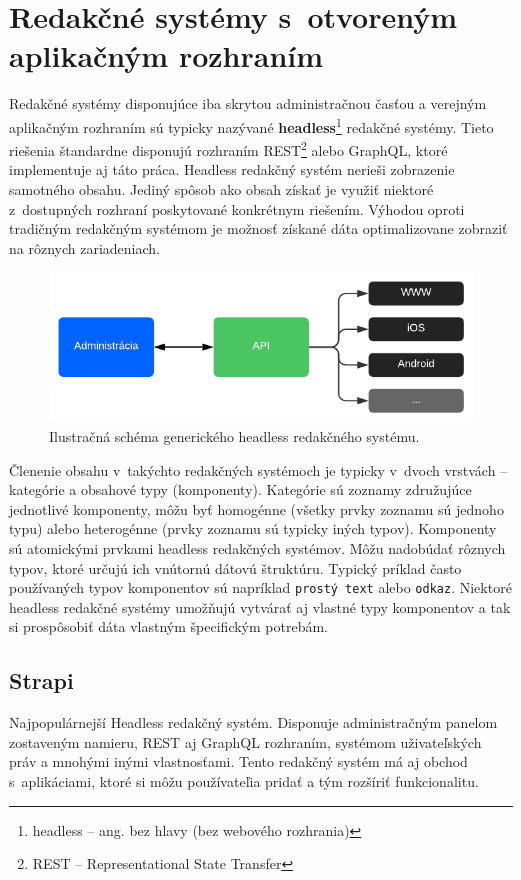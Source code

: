 \section{Redakčné systémy s~otvoreným aplikačným rozhraním}
\label{section:headless}
Redakčné systémy disponujúce iba skrytou administračnou časťou a verejným aplikačným rozhraním sú typicky nazývané \textbf{headless}\footnote{headless -- ang. bez hlavy (bez webového rozhrania)} redakčné systémy. Tieto riešenia štandardne disponujú rozhraním REST\footnote{REST -- Representational State Transfer} alebo GraphQL, ktoré implementuje aj táto práca. Headless redakčný systém nerieši zobrazenie samotného obsahu. Jediný spôsob ako obsah získať je využiť niektoré z~dostupných rozhraní poskytované konkrétnym riešením. Výhodou oproti tradičným redakčným systémom je možnosť získané dáta optimalizovane zobraziť na rôznych zariadeniach. 

\begin{figure}[h]
	\centering
	\includegraphics{obrazky-figures/headless_cms_graph.pdf}
	\caption{Ilustračná schéma generického headless redakčného systému.}
\end{figure}

\noindent Členenie obsahu v~takýchto redakčných systémoch je typicky v~dvoch vrstvách -- kategórie a obsahové typy (komponenty). Kategórie sú zoznamy združujúce jednotlivé komponenty, môžu byť homogénne (všetky prvky zoznamu sú jednoho typu) alebo heterogénne (prvky zoznamu sú typicky iných typov). Komponenty sú atomickými prvkami headless redakčných systémov. Môžu nadobúdať rôznych typov, ktoré určujú ich vnútornú dátovú štruktúru. Typický príklad často používaných typov komponentov sú napríklad \texttt{prostý text} alebo \texttt{odkaz}. Niektoré headless redakčné systémy umožňujú vytvárať aj vlastné typy komponentov a tak si prospôsobiť dáta vlastným špecifickým potrebám.

\subsection{Strapi}
Najpopulárnejší Headless redakčný systém. Disponuje administračným panelom zostaveným namieru, REST aj GraphQL rozhraním, systémom uživateľských práv a mnohými inými vlastnosťami. Tento redakčný systém má aj obchod s~aplikáciami, ktoré si môžu používateľia pridať a tým rozšíriť funkcionalitu. 

